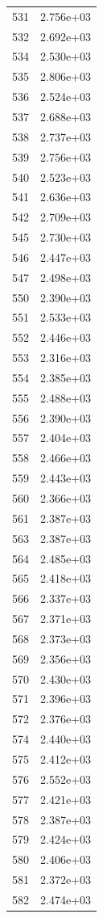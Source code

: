 \documentclass[12pt]{article}
\begin{document}
\begin{longtable}{@{}cc@{}}
531 & 2.756e+03 \\
532 & 2.692e+03 \\
534 & 2.530e+03 \\
535 & 2.806e+03 \\
536 & 2.524e+03 \\
537 & 2.688e+03 \\
538 & 2.737e+03 \\
539 & 2.756e+03 \\
540 & 2.523e+03 \\
541 & 2.636e+03 \\
542 & 2.709e+03 \\
545 & 2.730e+03 \\
546 & 2.447e+03 \\
547 & 2.498e+03 \\
550 & 2.390e+03 \\
551 & 2.533e+03 \\
552 & 2.446e+03 \\
553 & 2.316e+03 \\
554 & 2.385e+03 \\
555 & 2.488e+03 \\
556 & 2.390e+03 \\
557 & 2.404e+03 \\
558 & 2.466e+03 \\
559 & 2.443e+03 \\
560 & 2.366e+03 \\
561 & 2.387e+03 \\
563 & 2.387e+03 \\
564 & 2.485e+03 \\
565 & 2.418e+03 \\
566 & 2.337e+03 \\
567 & 2.371e+03 \\
568 & 2.373e+03 \\
569 & 2.356e+03 \\
570 & 2.430e+03 \\
571 & 2.396e+03 \\
572 & 2.376e+03 \\
574 & 2.440e+03 \\
575 & 2.412e+03 \\
576 & 2.552e+03 \\
577 & 2.421e+03 \\
578 & 2.387e+03 \\
579 & 2.424e+03 \\
580 & 2.406e+03 \\
581 & 2.372e+03 \\
582 & 2.474e+03 \\

\end{longtable}
\end{document}
